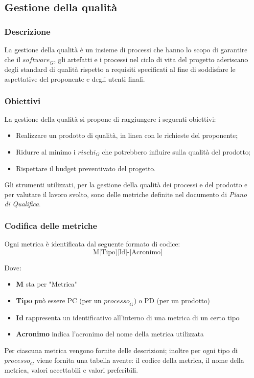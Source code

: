 \subsection{Gestione della qualità}
\subsubsection{Descrizione}
La gestione della qualità è un insieme di processi che hanno lo scopo di garantire che il $\textit{software}_G$, gli artefatti e i processi nel ciclo di vita del progetto aderiscano degli standard di qualità rispetto a requisiti specificati al fine di soddisfare le aspettative del proponente e degli utenti finali.
\subsubsection{Obiettivi}
La gestione della qualità si propone di raggiungere i seguenti obiettivi:
\begin{itemize}
    \item Realizzare un prodotto di qualità, in linea con le richieste del proponente;
    \item Ridurre al minimo i $\textit{rischi}_G$ che potrebbero influire sulla qualità del prodotto;
    \item Rispettare il budget preventivato del progetto.
\end{itemize}
Gli strumenti utilizzati, per la gestione della qualità dei processi e del prodotto e per valutare il lavoro svolto, sono delle metriche definite nel documento di \emph{Piano di Qualifica}. 
\subsubsection{Codifica delle metriche}
Ogni metrica è identificata dal seguente formato di codice:
\[
\text{M[Tipo][Id]-[Acronimo]}
\]

Dove:
\begin{itemize}
    \item \textbf{M} sta per "Metrica"
    \item \textbf{Tipo} può essere PC (per un $\textit{processo}_G$) o PD (per un prodotto)
    \item \textbf{Id} rappresenta un identificativo all'interno di una metrica di un certo tipo
    \item \textbf{Acronimo} indica l'acronimo del nome della metrica utilizzata
\end{itemize}
Per ciascuna metrica vengono fornite delle descrizioni; inoltre per ogni tipo di $\textit{processo}_G$ viene fornita una tabella avente: il codice della metrica, il nome della metrica, valori accettabili e valori preferibili.


